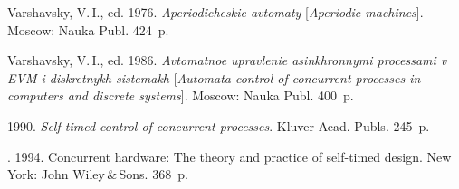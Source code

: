 \begin{multicols}{2}
{{\begin{thebibliography}{99}
Varshavsky, V.\,I., ed. 1976. 
\textit{Aperiodicheskie avtomaty} [\textit{Aperiodic machines}]. Moscow: Nauka Publ. 424~p.

Varshavsky, V.\,I., ed. 1986. 
\textit{Avtomatnoe upravlenie asinkhronnymi processami v EVM i diskretnykh sistemakh} 
[\textit{Automata control of concurrent processes in computers and discrete systems}]. 
Moscow: Nauka Publ. 400~p.

1990. \textit{Self-timed control of concurrent processes}. Kluver Acad. Publs. 245~p.

. 
1994. Concurrent hardware: The theory and practice of self-timed design. 
New York: John Wiley\,\&\,Sons. 368~p.


\end{thebibliography}}}
\end{multicols}
